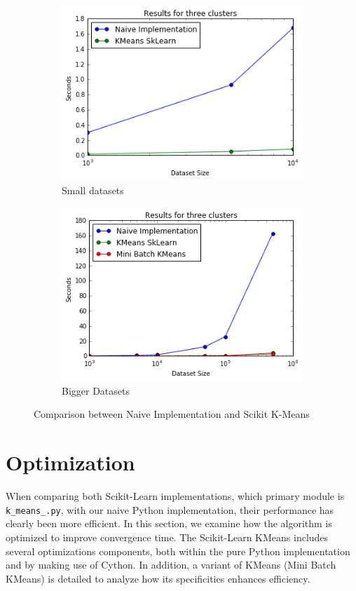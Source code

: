 \documentclass[11pt]{article}
\begin{document}
\begin{figure}[h!]
	\centering 
	\begin{subfigure}{0.48\textwidth}
		\includegraphics[width=\textwidth]{Figures/Comparison2.png}
		\caption{Small datasets}
	\end{subfigure}
	\quad
	\begin{subfigure}{0.48\textwidth}
		\includegraphics[width=\textwidth]{Figures/Comparison.png}
		\caption{Bigger Datasets}
	\end{subfigure} 
	\caption{Comparison between Naive Implementation and Scikit K-Means}
	\label{comp}
\end{figure}

	

\section*{Optimization}
When comparing both Scikit-Learn implementations, which primary module is \verb|k_means_.py|, with our naive Python implementation, their performance has clearly been more efficient.
In this section, we examine how the algorithm is optimized to improve convergence time. The Scikit-Learn KMeans includes several optimizations components, both within the pure Python implementation and by making use of Cython. In addition, a variant of KMeans (Mini Batch KMeans) is detailed to analyze how its specificities enhances efficiency.  
\end{document}
